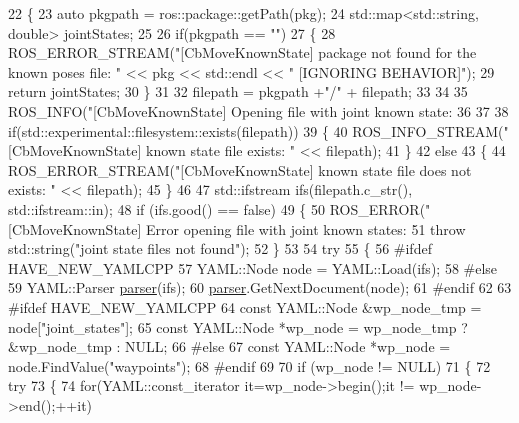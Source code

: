 \begin{DoxyCode}
22 \{
23   \textcolor{keyword}{auto} pkgpath = ros::package::getPath(pkg);
24   std::map<std::string, double> jointStates;
25 
26   \textcolor{keywordflow}{if}(pkgpath == \textcolor{stringliteral}{""})
27   \{
28     ROS\_ERROR\_STREAM(\textcolor{stringliteral}{"[CbMoveKnownState] package not found for the known poses file: "} << pkg << std::endl 
      << \textcolor{stringliteral}{" [IGNORING BEHAVIOR]"});
29     \textcolor{keywordflow}{return} jointStates;
30   \}
31 
32   filepath =  pkgpath +\textcolor{stringliteral}{"/"} + filepath;
33   
34 
35   ROS\_INFO(\textcolor{stringliteral}{"[CbMoveKnownState] Opening file with joint known state: %
36 
37 
38   \textcolor{keywordflow}{if}(std::experimental::filesystem::exists(filepath))
39   \{
40     ROS\_INFO\_STREAM(\textcolor{stringliteral}{"[CbMoveKnownState] known state file exists: "} << filepath);
41   \}
42   \textcolor{keywordflow}{else}
43   \{
44     ROS\_ERROR\_STREAM(\textcolor{stringliteral}{"[CbMoveKnownState] known state file does not exists: "} << filepath);
45   \}
46 
47   std::ifstream ifs(filepath.c\_str(), std::ifstream::in);
48   \textcolor{keywordflow}{if} (ifs.good() == \textcolor{keyword}{false})
49   \{
50     ROS\_ERROR(\textcolor{stringliteral}{"[CbMoveKnownState] Error opening file with joint known states: %
51     \textcolor{keywordflow}{throw} std::string(\textcolor{stringliteral}{"joint state files not found"});
52   \}
53 
54   \textcolor{keywordflow}{try}
55   \{
56 \textcolor{preprocessor}{#ifdef HAVE\_NEW\_YAMLCPP}
57     YAML::Node node = YAML::Load(ifs);
58 \textcolor{preprocessor}{#else}
59     YAML::Parser \hyperlink{namespacegenerate__debs_a4a9ae4bb85fc62d7973ea3d09ced6c26}{parser}(ifs);
60     \hyperlink{namespacegenerate__debs_a4a9ae4bb85fc62d7973ea3d09ced6c26}{parser}.GetNextDocument(node);
61 \textcolor{preprocessor}{#endif}
62 
63 \textcolor{preprocessor}{#ifdef HAVE\_NEW\_YAMLCPP}
64     \textcolor{keyword}{const} YAML::Node &wp\_node\_tmp = node[\textcolor{stringliteral}{"joint\_states"}];
65     \textcolor{keyword}{const} YAML::Node *wp\_node = wp\_node\_tmp ? &wp\_node\_tmp : NULL;
66 \textcolor{preprocessor}{#else}
67     \textcolor{keyword}{const} YAML::Node *wp\_node = node.FindValue(\textcolor{stringliteral}{"waypoints"});
68 \textcolor{preprocessor}{#endif}
69 
70     \textcolor{keywordflow}{if} (wp\_node != NULL)
71     \{
72       \textcolor{keywordflow}{try}
73       \{
74         \textcolor{keywordflow}{for}(YAML::const\_iterator it=wp\_node->begin();it != wp\_node->end();++it) 
}}
\end{DoxyCode}

